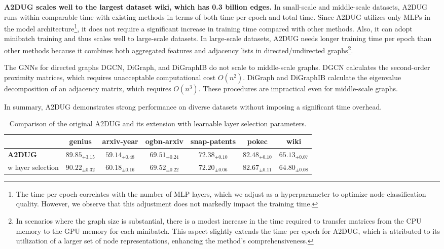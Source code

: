 \smallskip \noindent \textbf{A2DUG scales well to the largest dataset wiki, which has 0.3 billion edges. }
In small-scale and middle-scale datasets, A2DUG runs within comparable time with existing methods in terms of both time per epoch and total time. 
Since A2DUG utilizes only MLPs in the model architecture\footnote{The time per epoch correlates with the number of MLP layers, which we adjust as a hyperparameter to optimize node classification quality. However, we observe that this adjustment does not markedly impact the training time.}, it does not require a significant increase in training time compared with other methods. 
Also, it can adopt minibatch training and thus scales well to large-scale datasets. 
In large-scale datasets, \textsc{A2DUG} needs longer training time per epoch than other methods because it combines both aggregated features and adjacency lists in directed/undirected graphs\footnote{In scenarios where the graph size is substantial, there is a modest increase in the time required to transfer matrices from the CPU memory to the GPU memory for each minibatch. This aspect slightly extends the time per epoch for A2DUG, which is attributed to its utilization of a larger set of node representations, enhancing the method's comprehensiveness.}. 


The GNNs for directed graphs DGCN, DiGraph, and DiGraphIB do not scale to middle-scale graphs.
DGCN \cite{tong2020directed} calculates the second-order proximity matrices, which requires unacceptable computational cost $O(n^2)$. DiGraph and DiGraphIB \cite{tong2020digraph} calculate the eigenvalue decomposition of an adjacency matrix, which requires $O(n^3)$. These procedures are impractical even for middle-scale graphs.

In summary, A2DUG demonstrates strong performance on diverse datasets without imposing a significant time overhead. 

\begin{table*}[t]
    \caption{Comparison of the original A2DUG and its extension with learnable layer selection parameters. 
    }
    \centering
\begin{tabular}{l|ccc|ccc}
\toprule
 & genius & arxiv-year & ogbn-arxiv & snap-patents & pokec & wiki \\
\midrule
\textbf{A2DUG} & $89.85_{\pm3.15}$ & $59.14_{\pm0.48}$ & $69.51_{\pm0.24}$ & $72.38_{\pm0.10}$ & $82.48_{\pm0.10}$ & $65.13_{\pm0.07}$ \\
w layer selection & $90.22_{\pm0.32}$ & $60.18_{\pm0.16}$ & $69.52_{\pm0.22}$ & $72.20_{\pm0.06}$ & $82.67_{\pm0.11}$ & $64.80_{\pm0.08}$ \\
\bottomrule
\end{tabular}
\label{tb:layer_selection}
\end{table*}

